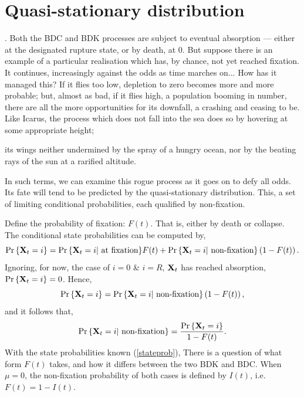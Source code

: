 \section{Quasi-stationary distribution }

\cite{van2011quasi}.  Both the BDC and BDK processes are subject to eventual absorption --- either at the designated rupture state, or by death, at 0. But suppose there is an example of a particular realisation which has, by chance, not yet reached fixation. It continues, increasingly against the odds as time marches on... How has it managed this? If it flies too low, depletion to zero becomes more and more probable; but, almost as bad, if it flies high, a population booming in number, there are all the more opportunities for its downfall, a crashing and ceasing to be.
Like Icarus, the process which does not fall into the sea does so by hovering at some appropriate height; 

its wings neither undermined by the spray of a hungry ocean, nor by the beating rays of the sun at a rarified altitude. \par
In such terms, we can examine this rogue process as it goes on to defy all odds. Its fate will tend to be predicted by the quasi-stationary distribution. This, a set of limiting conditional probabilities, each qualified by non-fixation.\par
Define the probability of fixation: $F(t)$. That is, either by death or collapse. The conditional state probabilities can be computed by,
$${\text{Pr}\left\{{{\bf X}_t} = i\right\}} = {\text{Pr}\left\{{{\bf X}_t}=i| \text{ at fixation}\right\}}F(t) + {\text{Pr}\left\{{{\bf X}_t}=i| \text{ non-fixation}\right\}} \left(1-F(t)\right).$$
Ignoring, for now, the case of $i = 0$ \& $i = R$, ${{\bf X}_t}$ has reached absorption, ${\text{Pr}\left\{{{\bf X}_t} = i\right\}} = 0$. Hence,
 $${\text{Pr}\left\{{{\bf X}_t} = i\right\}} =  {\text{Pr}\left\{{{\bf X}_t}=i| \text{ non-fixation}\right\}} \left(1-F(t)\right),$$
and it follows that,
$${\text{Pr}\left\{{{\bf X}_t}=i| \text{ non-fixation}\right\}} = \frac{{\text{Pr}\left\{{{\bf X}_t} = i\right\}} }{1-F(t)}.$$
With the state probabilities known (\ref{stateprob}), 
There is a question of what form $F(t)$ takes, and how it differs between the two BDK and BDC. When $\mu=0$, the non-fixation probability of both cases is defined by $I(t)$, i.e. $F(t) = 1-I(t)$.



